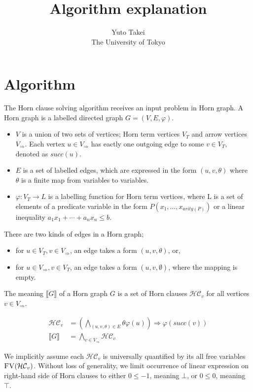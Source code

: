 \documentclass[a4paper,12pt]{article}
\title{Algorithm explanation}
\author{Yuto Takei \\ The University of Tokyo}
\begin{document}
\maketitle

\section{Algorithm}

The Horn clause solving algorithm receives an input problem in Horn
graph. A Horn graph is a labelled directed graph $G=(V,E,\varphi)$.
\begin{itemize}
\item $V$ is a union of two sets of vertices; Horn term vertices $V_T$
  and arrow vertices $V_\Rightarrow$. Each vertex $u \in
  V_\Rightarrow$ has eactly one outgoing edge to some $v \in V_T$,
  denoted as $succ(u)$.
\item $E$ is a set of labelled edges, which are expressed in the form
  $(u,v,\theta)$ where $\theta$ is a finite map from variables to
  variables.
\item $\varphi: V_T \rightarrow L$ is a labelling function for Horn
  term vertices, where L is a set of elements of a predicate variable
  in the form $P(x_1, ..., x_{arity(P)})$ or a linear inequality $a_1
  x_1 + \cdots + a_n x_n \leq b$.
\end{itemize}

There are two kinds of edges in a Horn graph;
\begin{itemize}
\item for $u \in V_T, v \in V_\Rightarrow$, an edge takes a form
  $(u,v,\theta)$, or,
\item for $u \in V_\Rightarrow, v \in V_T$, an edge takes a form
  $(u,v,\emptyset)$, where the mapping is empty.
\end{itemize}

The meaning $\llbracket G \rrbracket $ of a Horn graph $G$ is a set of
Horn clauses $\mathcal{HC}_v$ for all vertices $v \in V_\Rightarrow$.

\begin{align*}
\mathcal{HC}_v & = \left( \bigwedge_{(u,v,\theta) \in E} \theta \varphi(u) \right) \Longrightarrow \varphi(succ(v)) \\
\llbracket G \rrbracket & = \bigwedge_{v \in V_\Rightarrow} \mathcal{HC}_v
\end{align*}

We implicitly assume each $\mathcal{HC}_v$ is universally quantified
by its all free variables $\textsc{FV}(\mathcal{HC}_v)$. Without loss
of generality, we limit occurrence of linear expression on right-hand
side of Horn clauses to either $0 \leq -1$, meaning $\bot$, or $0 \leq
0$, meaning $\top$.
\end{document}
